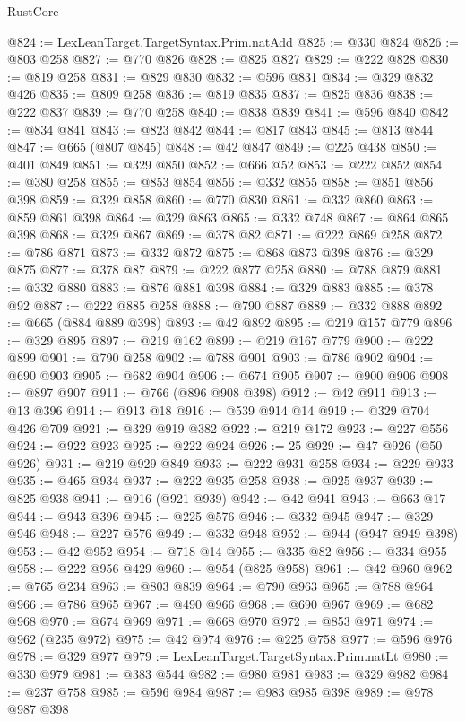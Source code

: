 \begin{lexlean}{RustCore}
\begin{coremodule}
@824 := LexLeanTarget.TargetSyntax.Prim.natAdd
@825 := @330 @824
@826 := @803 @258
@827 := @770 @826
@828 := @825 @827
@829 := @222 @828
@830 := @819 @258
@831 := @829 @830
@832 := @596 @831
@834 := @329 @832 @426
@835 := @809 @258
@836 := @819 @835
@837 := @825 @836
@838 := @222 @837
@839 := @770 @258
@840 := @838 @839
@841 := @596 @840
@842 := @834 @841
@843 := @823 @842
@844 := @817 @843
@845 := @813 @844
@847 := @665 (@807 @845)
@848 := @42 @847
@849 := @225 @438
@850 := @401 @849
@851 := @329 @850
@852 := @666 @52
@853 := @222 @852
@854 := @380 @258
@855 := @853 @854
@856 := @332 @855
@858 := @851 @856 @398
@859 := @329 @858
@860 := @770 @830
@861 := @332 @860
@863 := @859 @861 @398
@864 := @329 @863
@865 := @332 @748
@867 := @864 @865 @398
@868 := @329 @867
@869 := @378 @82
@871 := @222 @869 @258
@872 := @786 @871
@873 := @332 @872
@875 := @868 @873 @398
@876 := @329 @875
@877 := @378 @87
@879 := @222 @877 @258
@880 := @788 @879
@881 := @332 @880
@883 := @876 @881 @398
@884 := @329 @883
@885 := @378 @92
@887 := @222 @885 @258
@888 := @790 @887
@889 := @332 @888
@892 := @665 (@884 @889 @398)
@893 := @42 @892
@895 := @219 @157 @779
@896 := @329 @895
@897 := @219 @162
@899 := @219 @167 @779
@900 := @222 @899
@901 := @790 @258
@902 := @788 @901
@903 := @786 @902
@904 := @690 @903
@905 := @682 @904
@906 := @674 @905
@907 := @900 @906
@908 := @897 @907
@911 := @766 (@896 @908 @398)
@912 := @42 @911
@913 := @13 @396
@914 := @913 @18
@916 := @539 @914 @14
@919 := @329 @704 @426 @709
@921 := @329 @919 @382
@922 := @219 @172
@923 := @227 @556
@924 := @922 @923
@925 := @222 @924
@926 := 25
@929 := @47 @926 (@50 @926)
@931 := @219 @929 @849
@933 := @222 @931 @258
@934 := @229 @933
@935 := @465 @934
@937 := @222 @935 @258
@938 := @925 @937
@939 := @825 @938
@941 := @916 (@921 @939)
@942 := @42 @941
@943 := @663 @17
@944 := @943 @396
@945 := @225 @576
@946 := @332 @945
@947 := @329 @946
@948 := @227 @576
@949 := @332 @948
@952 := @944 (@947 @949 @398)
@953 := @42 @952
@954 := @718 @14
@955 := @335 @82
@956 := @334 @955
@958 := @222 @956 @429
@960 := @954 (@825 @958)
@961 := @42 @960
@962 := @765 @234
@963 := @803 @839
@964 := @790 @963
@965 := @788 @964
@966 := @786 @965
@967 := @490 @966
@968 := @690 @967
@969 := @682 @968
@970 := @674 @969
@971 := @668 @970
@972 := @853 @971
@974 := @962 (@235 @972)
@975 := @42 @974
@976 := @225 @758
@977 := @596 @976
@978 := @329 @977
@979 := LexLeanTarget.TargetSyntax.Prim.natLt
@980 := @330 @979
@981 := @383 @544
@982 := @980 @981
@983 := @329 @982
@984 := @237 @758
@985 := @596 @984
@987 := @983 @985 @398
@989 := @978 @987 @398

\end{coremodule}
\end{lexlean}
